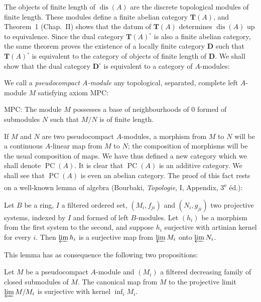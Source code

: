 The objects of finite length of $\operatorname{dis}(A)$ are the
discrete topological modules of finite length. These modules define a
finite abelian category $\mathbf{T}(A)$, and Theorem~1 (Chap.~II) shows
that the datum of $\mathbf{T}(A)$ determines $\operatorname{dis}(A)$ up
to equivalence. Since the dual category $\mathbf{T}(A)^\circ$ is also a
finite abelian category, the same theorem proves the existence of a
locally finite category $\mathbf{D}$ such that $\mathbf{T}(A)^\circ$ is
equivalent to the category of objects of finite length of
$\mathbf{D}$. We shall show that the dual category $\mathbf{D}^\circ$
is equivalent to a category of $A$-modules:

We call a \emph{pseudocompact $A$-module} any topological, separated,
complete left $A$-module $M$ satisfying axiom MPC:

MPC: The module $M$ possesses a base of neighbourhoods of $0$ formed
of submodules $N$ such that $M/N$ is of finite length.

If $M$ and $N$ are two pseudocompact $A$-modules, a morphism from $M$
to $N$ will be a continuous $A$-linear map from $M$ to $N$; the
composition of morphisms will be the usual composition of maps. We have
thus defined a new category which we shall denote
$\operatorname{PC}(A)$. It is clear that $\operatorname{PC}(A)$ is an
additive category. We shall see that $\operatorname{PC}(A)$ is even an
abelian category. The proof of this fact rests on a well-known lemma of
algebra (Bourbaki, \emph{Topologie}, I, Appendix, 3\textsuperscript{e}
éd.):

\begin{lemma}
Let $B$ be a ring, $I$ a filtered ordered set, $(M_i,f_{ji})$ and
$(N_i,g_{ji})$ two projective systems, indexed by $I$ and formed of
left $B$-modules. Let $(h_i)$ be a morphism from the first system to
the second, and suppose $h_i$ surjective with artinian kernel for every
$i$. Then $\varprojlim h_i$ is a surjective map from $\varprojlim M_i$
onto $\varprojlim N_i$.
\end{lemma}

This lemma has as consequence the following two propositions:

\begin{proposition}
Let $M$ be a pseudocompact $A$-module and $(M_i)$ a filtered decreasing
family of closed submodules of $M$. The canonical map from $M$ to the
projective limit $\varprojlim M/M_i$ is surjective with kernel
$\inf_i M_i$.
\end{proposition}

